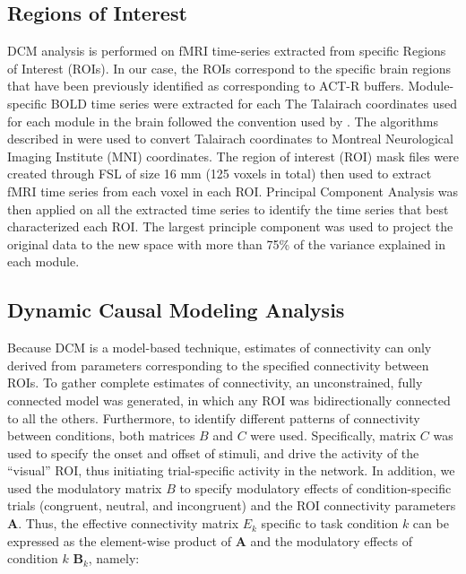 \documentclass[10pt,letterpaper]{article}
\newcommand{\mat}[1]{\boldsymbol{#1}} %
\begin{document}
\subsection{Regions of Interest}

DCM analysis is performed on fMRI time-series extracted from specific Regions of Interest (ROIs). In our case, the ROIs correspond to the specific brain regions that have been previously identified as corresponding to ACT-R buffers. Module-specific BOLD time series were extracted for each  The Talairach coordinates used for each module in the brain followed the convention used by \cite{Anderson2008, Borst2017}. The algorithms described in \cite{Lacadie2008} were used to convert Talairach coordinates to Montreal Neurological Imaging Institute (MNI) coordinates. The region of interest (ROI) mask files were created through FSL \cite{Woolrich2009} of size 16 mm (125 voxels in total) then used to extract fMRI time series from each voxel in each ROI. Principal Component Analysis was then applied on all the extracted time series to identify the time series that best characterized each ROI. The largest principle component was used to project the original data to the new space with more than 75\% of the variance explained in each module. 

\subsection{Dynamic Causal Modeling Analysis}

Because DCM is a model-based technique, estimates of connectivity can only derived from parameters corresponding to the specified connectivity between ROIs.  To gather complete estimates of connectivity, an unconstrained, fully connected model was generated, in which any ROI was bidirectionally connected to all the others. Furthermore, to identify different patterns of connectivity between conditions, both matrices $B$ and $C$ were used. Specifically, matrix $C$ was used to specify the onset and offset of stimuli, and drive the activity  of the ``visual'' ROI, thus initiating trial-specific activity in the network. In addition, we used the modulatory matrix $B$ to specify modulatory effects of condition-specific trials (congruent, neutral, and incongruent) and the ROI connectivity parameters $\mat{A}$. Thus, the effective connectivity matrix $E_k$ specific to task condition $k$ can be expressed as the element-wise product of $\mat{A}$ and the modulatory effects of condition $k$ $\mat{B}_k$, namely:
\end{document}
